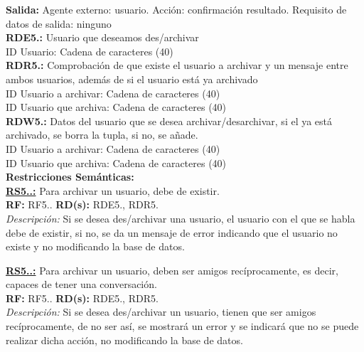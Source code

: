 \textbf{\textcolor{rojo}{Salida:}} Agente externo: usuario. Acción: confirmación resultado. 
Requisito de datos de salida: ninguno \\[12pt]

\textcolor{azul}{\textbf{RDE5.\theRDE:}} Usuario que deseamos des/archivar   \\
\hspace*{1cm} ID Usuario: Cadena de caracteres (40) \\[12pt]

\textcolor{azul}{\textbf{RDR5.\theRDR:}} Comprobación de que existe el usuario a archivar y un mensaje entre ambos usuarios, además de si el usuario está ya archivado\\
\hspace*{1cm} ID Usuario a archivar: Cadena de caracteres (40) \\
\hspace*{1cm} ID Usuario que archiva: Cadena de caracteres (40) \\[12pt]

\textcolor{azul}{\textbf{RDW5.\theRDW:}} Datos del usuario que se desea archivar/desarchivar, si el ya está archivado, se borra la tupla, si no, se añade. \\
\hspace*{1cm} ID Usuario a archivar: Cadena de caracteres (40) \\
\hspace*{1cm} ID Usuario que archiva: Cadena de caracteres (40) \\[12pt]

\setcounter{RS}{1}
\textbf{\textcolor{verde}{Restricciones Semánticas:}} \\[6pt]
\textbf{\textcolor{verde}{\underline{RS5.\theRF.\theRS:}}} Para archivar un usuario, debe de existir. \\
\textbf{RF:} RF5.\theRF. \textbf{RD(s):} RDE5.\theRDE, RDR5.\theRDR \\
\hspace*{1cm} \textit{Descripción:} Si se desea des/archivar una usuario, el usuario con el que se habla debe de existir, si no, se da un mensaje de error indicando que el usuario no existe y no modificando la base de datos. \\ [6pt]

\textbf{\textcolor{verde}{\underline{RS5.\theRF.\theRS:}}} Para archivar un usuario, deben ser amigos recíprocamente, es decir, capaces de tener una conversación. \\
\textbf{RF:} RF5.\theRF. \textbf{RD(s):} RDE5.\theRDE, RDR5.\theRDR \\
\hspace*{1cm} \textit{Descripción:} Si se desea des/archivar un usuario, tienen que ser amigos recíprocamente, de no ser así, se mostrará un error y se indicará que no se puede realizar dicha acción, no modificando la base de datos. \\ [6pt]


